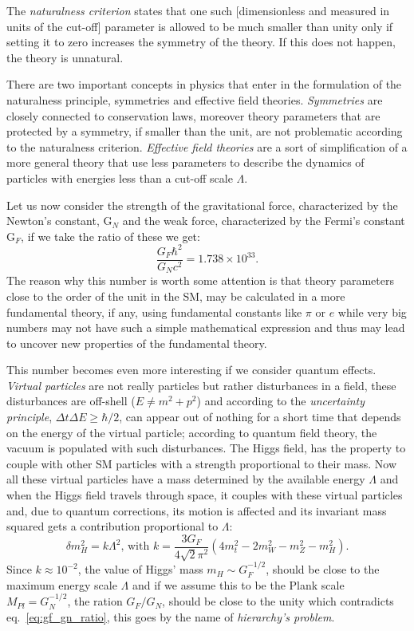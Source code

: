 The \emph{naturalness criterion} states that one such [dimensionless and
measured in units of the cut-off] parameter is allowed to be much smaller than
unity only if setting it to zero increases the symmetry of the theory. If this
does not happen, the theory is unnatural\cite{thooft:gauge}.

There are two important concepts in physics that enter in the formulation of the
naturalness principle, symmetries and effective field
theories. \emph{Symmetries} are closely connected to conservation laws, moreover
theory parameters that are protected by a symmetry, if smaller than the unit,
are not problematic according to the naturalness criterion. \emph{Effective
  field theories} are a sort of simplification of a more general theory that use
less parameters to describe the dynamics of particles with energies less than a
cut-off scale $\Lambda$.

Let us now consider the strength of the gravitational force, characterized by
the Newton's constant, G$_N$ and the weak force, characterized by the Fermi's
constant G$_F$, if we take the ratio of these we get:
\begin{equation}
  \label{eq:gf_gn_ratio}
  \frac{G_F \hbar^2}{G_N c^2} = 1.738 \times 10^{33}.
\end{equation}
The reason why this number is worth some attention is that theory parameters
close to the order of the unit in the SM, may be calculated in a more
fundamental theory, if any, using fundamental constants like $\pi$ or $e$ while
very big numbers may not have such a simple mathematical expression and thus may
lead to uncover new properties of the fundamental theory.

This number becomes even more interesting if we consider quantum effects.
\emph{Virtual particles} are not really particles but rather disturbances in a
field, these disturbances are off-shell ($E \neq m^2 + p^2$) and according to
the \emph{uncertainty principle}, $\Delta t \Delta E \geq \hbar / 2$, can appear
out of nothing for a short time that depends on the energy of the virtual
particle; according to quantum field theory, the vacuum is populated with such
disturbances. The Higgs field, has the property to couple with other SM
particles with a strength proportional to their mass. Now all these virtual
particles have a mass determined by the available energy $\Lambda$ and when the
Higgs field travels through space, it couples with these virtual particles and,
due to quantum corrections, its motion is affected and its invariant mass
squared gets a contribution proportional to $\Lambda$:
\begin{equation}
  \label{eq:delta_mh}
  \delta m_H^2 = k \Lambda^2 \text{, with } k = \frac{3 G_F}{4 \sqrt{2}
    \pi^2}(4m_t^2 - 2m_W^2 - m_Z^2 - m_H^2).
\end{equation}
Since $k \approx 10^{-2}$\cite{Giudice:2008bi}, the value of Higgs' mass
$m_H \sim G_F^{-1/2}$, should be close to the maximum energy scale $\Lambda$ and
if we assume this to be the Plank scale $M_{Pl} = G_N^{-1/2}$, the ration
$G_F/G_N$, should be close to the unity which contradicts
eq.~\eqref{eq:gf_gn_ratio}, this goes by the name of \emph{hierarchy's
  problem}.

